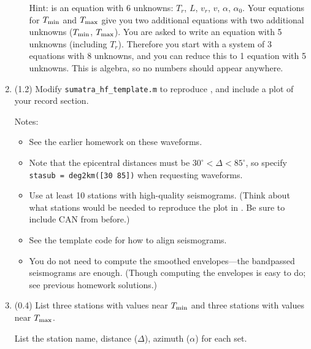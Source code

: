 \documentclass[11pt,titlepage,fleqn]{article}
\begin{document}
\begin{enumerate}
\begin{enumerate}
Hint:  is an equation with 6 unknowns: $T_r$, $L$, $v_r$, $v$, $\alpha$, $\alpha_0$. Your equations for $T_{\rm min}$ and $T_{\rm max}$ give you two additional equations with two additional unknowns ($T_{\rm min}$, $T_{\rm max}$). You are asked to write an equation with 5 unknowns (including $T_r$). Therefore you start with a system of 3 equations with 8 unknowns, and you can reduce this to 1 equation with 5 unknowns. This is algebra, so no numbers should appear anywhere.

\end{enumerate}


\item (1.2) Modify \verb+sumatra_hf_template.m+ to reproduce \citet[][Figure~1d]{Ni2005}, and include a plot of your record section.

Notes:
%
\begin{itemize}
\item See the earlier homework on these waveforms.

\item Note that the epicentral distances must be $30^\circ < \Delta < 85^\circ$, so specify \\
\verb+stasub = deg2km([30 85])+ when requesting waveforms.

\item Use at least 10 stations with high-quality seismograms. (Think about what stations would be needed to reproduce the plot in \citet{Ni2005}. Be sure to include CAN from before.)

\item See the template code for how to align seismograms.

\item You do not need to compute the smoothed envelopes---the bandpassed seismograms are enough. (Though computing the envelopes is easy to do; see previous homework solutions.) 
\end{itemize}


\item (0.4) List three stations with values near $T_{\rm min}$ and three stations with values near $T_{\rm max}$.

List the station name, distance ($\Delta$), azimuth ($\alpha$) for each set.



\end{enumerate}
\end{document}
